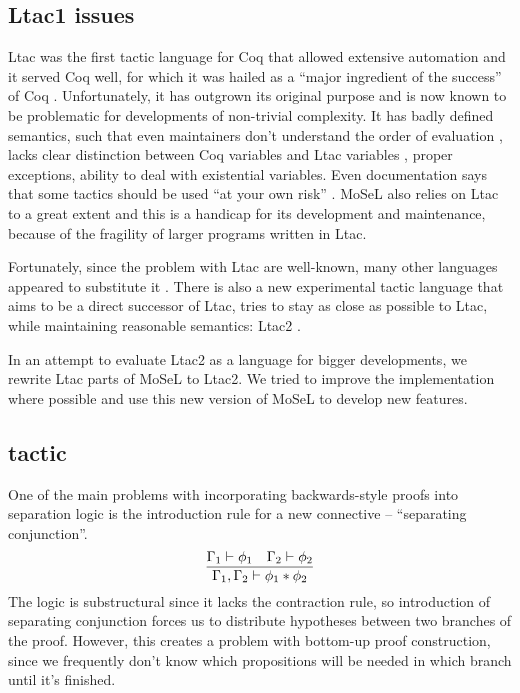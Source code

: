 \subsection{Ltac1 issues}
\label{sec:ltac1-issues}
Ltac was the first tactic language for Coq that allowed extensive automation and it served Coq well, for which it was hailed as a ``major ingredient of the success'' of Coq \cite{pedrotLtac2TacticalWarfare2019}.
Unfortunately, it has outgrown its original purpose and is now known to be problematic for developments of non-trivial complexity.
It has badly defined semantics, such that even maintainers don't understand the order of evaluation \cite{pedrotLtacInternals2016}, lacks clear distinction between Coq variables and Ltac variables \cite{pedrotLtacInternals2016}, proper exceptions, ability to deal with existential variables.
Even documentation says that some tactics should be used ``at your own risk'' \cite[Section~3.3.1]{thecoqdevelopmentteamCoqProofAssistant2020}.
MoSeL also relies on Ltac to a great extent and this is a handicap for its development and maintenance, because of the fragility of larger programs written in Ltac.

Fortunately, since the problem with Ltac are well-known, many other languages appeared to substitute it \cite{malechaExtensibleEfficientAutomation2016, zilianiMtacMonadTyped2013, kaiserMtac2TypedTactics2018a, tassiElpiExtensionLanguage2018}.
There is also a new experimental tactic language that aims to be a direct successor of Ltac, tries to stay as close as possible to Ltac, while maintaining reasonable semantics: Ltac2 \cite{pedrotLtac2TacticalWarfare2019}.

In an attempt to evaluate Ltac2 as a language for bigger developments, we rewrite Ltac parts of MoSeL to Ltac2.
We tried to improve the implementation where possible and use this new version of MoSeL to develop new features.

\subsection{ tactic}
\label{sec:isplit-tactic}

One of the main problems with incorporating backwards-style proofs into separation logic is the introduction rule for a new connective -- ``separating conjunction''.
\[\infer{\Gamma_1, \Gamma_2 \vdash \phi_1 \ast \phi_2}
        {\Gamma_1 \vdash \phi_1 &
         \Gamma_2 \vdash \phi_2} \]
The logic is substructural since it lacks the contraction rule, so introduction of separating conjunction forces us to distribute hypotheses between two branches of the proof.
However, this creates a problem with bottom-up proof construction, since we frequently don't know which propositions will be needed in which branch until it's finished.

